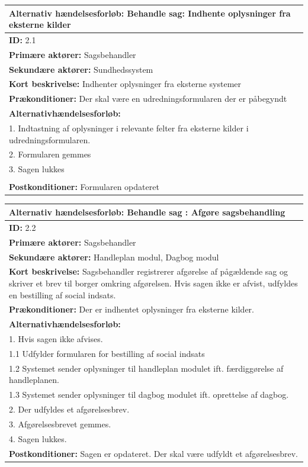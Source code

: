 \begin{center} \label{tab:2.1}
\begin{longtable}{|p{18cm}|}
\hline
\textbf{Alternativ hændelsesforløb:} Behandle sag: Indhente oplysninger fra eksterne kilder \\
\hline
\textbf{ID:} 2.1 \\
\hline
\textbf{Primære aktører:} Sagsbehandler\\
\hline
\textbf{Sekundære aktører:} Sundhedssystem \\
\hline
\textbf{Kort beskrivelse: }Indhenter oplysninger fra eksterne systemer\\
\hline
\textbf{Prækonditioner: }Der skal være en udredningsformularen der er påbegyndt\\
\hline
\textbf{Alternativhændelsesforløb:}\\
1. Indtastning af oplysninger i relevante felter fra eksterne kilder i udredningsformularen.\\
2. Formularen gemmes\\
3. Sagen lukkes\\
\\
\hline
\textbf{Postkonditioner:} Formularen opdateret \\
\hline
\end{longtable}
\end{center}

\begin{center} \label{tab:2.2}
\begin{longtable}{|p{18cm}|}
\hline
\textbf{Alternativ hændelsesforløb:} Behandle sag : Afgøre sagsbehandling \\
\hline
\textbf{ID:} 2.2 \\
\hline
\textbf{Primære aktører:} Sagsbehandler\\
\hline
\textbf{Sekundære aktører:} Handleplan modul, Dagbog modul \\
\hline
\textbf{Kort beskrivelse: }Sagsbehandler registrerer afgørelse af pågældende sag og skriver et brev til borger omkring afgørelsen. Hvis sagen ikke er afvist, udfyldes en bestilling af social indsats.\\
\hline
\textbf{Prækonditioner: }Der er indhentet oplysninger fra eksterne kilder. 
\\
\hline
\textbf{Alternativhændelsesforløb:}\\
1. Hvis sagen ikke afvises.\\
1.1 Udfylder formularen for bestilling af social indsats\\
1.2 Systemet sender oplysninger til handleplan modulet ift. færdiggørelse af handleplanen.\\
1.3 Systemet sender oplysninger til dagbog modulet ift.  oprettelse af dagbog.\\
2. Der udfyldes et afgørelsesbrev. \\
3. Afgørelsesbrevet gemmes.\\
4. Sagen lukkes.
\\
\hline
\textbf{Postkonditioner:} Sagen er opdateret. Der skal være udfyldt et afgørelsesbrev.  \\
\hline
\end{longtable}
\end{center}

